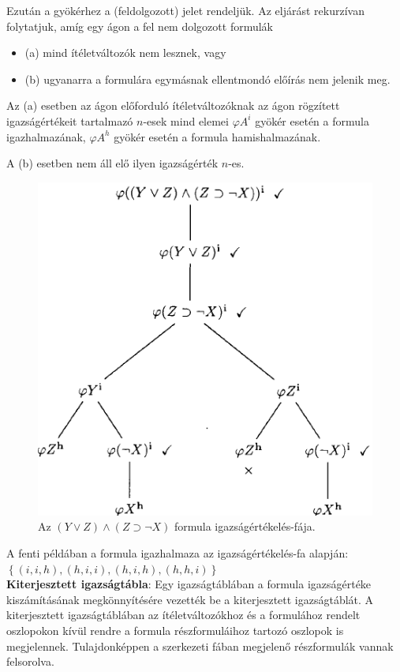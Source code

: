 \documentclass[margin=0px]{article}
\begin{document}
	Ezután a gyökérhez a \checkmark (feldolgozott) jelet rendeljük. Az eljárást rekurzívan folytatjuk, amíg egy ágon a fel nem dolgozott
	formulák
	
	\begin{itemize}
		\item	(a) mind ítéletváltozók nem lesznek, vagy
		
		\item	(b) ugyanarra a formulára egymásnak ellentmondó előírás nem jelenik meg. 
	\end{itemize}
	
	Az (a) esetben az ágon előforduló ítéletváltozóknak az ágon rögzített igazságértékeit tartalmazó $n$-esek mind elemei $\varphi A^{i}$
	gyökér esetén a formula igazhalmazának, $\varphi A^{h}$ gyökér esetén a formula hamishalmazának.
	
	A (b) esetben nem áll elő ilyen igazságérték $n$-es.
	
	\begin{figure}[H]
		\centering
		\includegraphics[width=0.5\linewidth]{img/igazsagertfapelda}
		\caption{Az $(Y \vee Z) \wedge (Z \supset \neg X)$ formula igazságértékelés-fája.}
		\label{fig:igazsagertfapelda}
	\end{figure}
	
	\noindent A fenti példában a formula igazhalmaza az igazságértékelés-fa alapján: $\left\{(i,i,h),(h,i,i),(h,i,h),(h,h,i)\right\}$\\

	\noindent \textbf{Kiterjesztett igazságtábla}: Egy igazságtáblában a formula igazságértéke kiszámításának megkönnyítésére vezették
	be a kiterjesztett igazságtáblát. A kiterjesztett igazságtáblában az ítéletváltozókhoz és a formulához rendelt oszlopokon kívül rendre
	a formula részformuláihoz tartozó oszlopok is megjelennek. Tulajdonképpen a szerkezeti fában megjelenő részformulák vannak felsorolva.
	
\end{document}
